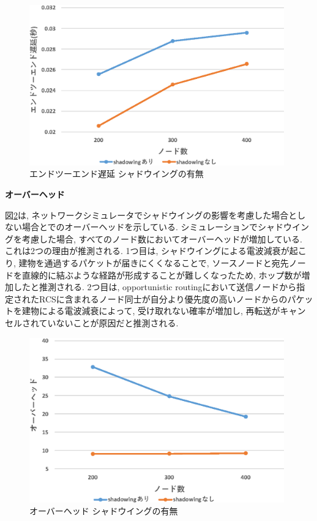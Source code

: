 \documentclass[10pt]{jreport}
\begin{document}
\begin{figure}[!ht]
	\centering
	\includegraphics[width=110mm]{figures/LSGO_delay.eps}
	\caption{エンドツーエンド遅延 シャドウイングの有無}
	\label{fig:LSGO-delay}
\end{figure}


\par
\vspace{5mm}
\noindent
\textbf{オーバーヘッド}
\vspace{5mm}

図\ref{fig:LSGO-overhead}は, ネットワークシミュレータでシャドウイングの影響を考慮した場合としない場合とでのオーバーヘッドを示している.
シミュレーションでシャドウイングを考慮した場合, すべてのノード数においてオーバーヘッドが増加している. これは2つの理由が推測される.
1つ目は, シャドウイングによる電波減衰が起こり, 建物を通過するパケットが届きにくくなることで,  ソースノードと宛先ノードを直線的に結ぶような経路が形成することが難しくなったため, ホップ数が増加したと推測される. 
2つ目は, opportunistic routingにおいて送信ノードから指定されたRCSに含まれるノード同士が自分より優先度の高いノードからのパケットを建物による電波減衰によって, 受け取れない確率が増加し, 再転送がキャンセルされていないことが原因だと推測される.


\begin{figure}[!ht]
	\centering
	\includegraphics[width=110mm]{figures/LSGO_overhead.eps}
	\caption{オーバーヘッド シャドウイングの有無}
	\label{fig:LSGO-overhead}
\end{figure}
\end{document}

